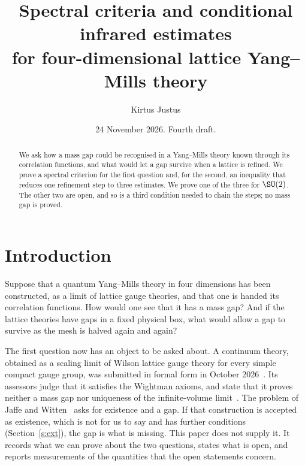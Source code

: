 
\usepackage{tikz}
\usetikzlibrary{positioning,arrows.meta}
\title[Spectral criteria and conditional infrared estimates]{Spectral criteria and conditional infrared estimates\\ for four-dimensional lattice Yang--Mills theory}
\author{Kirtus Justus}
\address{Theoretical Physicist, Port Coquitlam, British Columbia, Canada}
\date{24 November 2026. Fourth draft.}

\begin{abstract}
We ask how a mass gap could be recognised in a Yang--Mills theory known through its correlation functions,
and what would let a gap survive when a lattice is refined. We prove a spectral criterion for the first
question and, for the second, an inequality that reduces one refinement step to three estimates. We prove one
of the three for $\SU(2)$. The other two are open, and so is a third condition needed to chain the
steps; no mass gap is proved.
\end{abstract}
\maketitle
\tableofcontents

\section{Introduction}\label{s:intro}

Suppose that a quantum Yang--Mills theory in four dimensions has been constructed, as a limit of lattice
gauge theories, and that one is handed its correlation functions. How would one see that it has a mass gap?
And if the lattice theories have gaps in a fixed physical box, what would allow a gap to survive as the mesh is
halved again and again?

The first question now has an object to be asked about. A continuum theory, obtained as a scaling limit of
Wilson lattice gauge theory for every simple compact gauge group, was submitted in formal form in October
2026~\cite{OAI}. Its assessors judge that it satisfies the Wightman axioms, and state that it proves neither a
mass gap nor uniqueness of the infinite-volume limit~\cite[p.~1]{YMG}. The problem of Jaffe and
Witten~\cite[\S4]{JW} asks for existence and a gap. If that construction is accepted as existence, which is
not for us to say and has further conditions (Section~\ref{s:ext}), the gap is what is missing. This paper
does not supply it. It records what we can prove about the two questions, states what is open, and reports measurements of
the quantities that the open statements concern.

